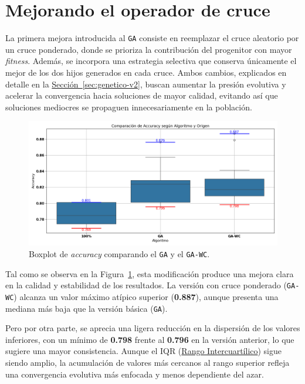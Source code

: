 \section{Mejorando el operador de cruce}\label{sec:incorporacion-cruce}
La primera mejora introducida al \texttt{GA} consiste en reemplazar el cruce aleatorio por un cruce ponderado,
donde se prioriza la contribución del progenitor con mayor \textit{fitness}.
Además, se incorpora una estrategia selectiva que conserva únicamente el mejor de los dos hijos generados en cada cruce.
Ambos cambios, explicados en detalle en la \hyperref[sec:genetico-v2]{Sección~\ref*{sec:genetico-v2}},
buscan aumentar la presión evolutiva y acelerar la convergencia hacia soluciones de mayor calidad,
evitando así que soluciones mediocres se propaguen innecesariamente en la población.

\begin{figure}[htp]
    \centering
    \includegraphics[width=1\textwidth]{imagenes/evaluaciones/operador-de-cruce.png}
    \caption{Boxplot de \textit{accuracy} comparando el \texttt{GA} y el \texttt{GA-WC}.}
    \label{fig:cruce_ponderado}
\end{figure}

Tal como se observa en la Figura~\ref{fig:cruce_ponderado}, esta modificación produce una mejora clara en la calidad y estabilidad de los resultados.
La versión con cruce ponderado (\texttt{GA-WC}) alcanza un valor máximo atípico superior (\textbf{0.887}),
aunque presenta una mediana más baja que la versión básica (\texttt{GA}).

Pero por otra parte, se aprecia una ligera reducción en la dispersión de los valores inferiores,
con un mínimo de \textbf{0.798} frente al \textbf{0.796} en la versión anterior, lo que sugiere una mayor consistencia.
Aunque el IQR (\hyperref[subsec:visualizacion-de-resultados]{Rango Intercuartílico}) sigue siendo amplio,
la acumulación de valores más cercanos al rango superior refleja una convergencia evolutiva más enfocada y menos dependiente del azar.

